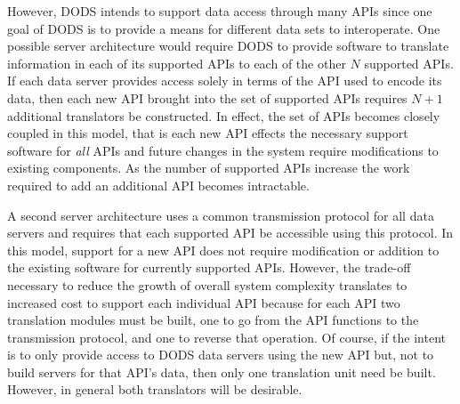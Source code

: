 However, DODS intends to support data access through many APIs since one goal
of DODS is to provide a means for different data sets to interoperate. One
possible server architecture would require DODS to provide software to
translate information in each of its supported APIs to each of the other $N$
supported APIs. If each data server provides access solely in terms of the
API used to encode its data, then each new API brought into the set of
supported APIs requires $N+1$ additional translators be constructed. In
effect, the set of APIs becomes closely coupled in this model, that is each
new API effects the necessary support software for {\em all\/} APIs and
future changes in the system require modifications to existing components. As
the number of supported APIs increase the work required to add an additional
API becomes intractable.


A second server architecture uses a common transmission protocol for all data
servers and requires that each supported API be accessible using this
protocol. In this model, support for a new API does not require modification
or addition to the existing software for currently supported APIs. However,
the trade-off necessary to reduce the growth of overall system complexity
translates to increased cost to support each individual API because for each
API two translation modules must be built, one to go from the API functions
to the transmission protocol, and one to reverse that operation. Of course,
if the intent is to only provide access to DODS data servers using the new
API but, not to build servers for that API's data, then only one translation
unit need be built. However, in general both translators will be desirable.

